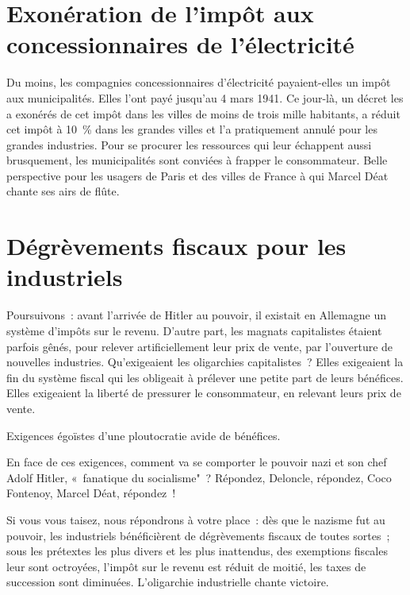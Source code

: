 \documentclass[french,twoside]{book} %
\begin{document}
\section[{Exonération de l’impôt aux concessionnaires de l’électricité}]{Exonération de l’impôt aux concessionnaires de l’électricité}
\noindent Du moins, les compagnies concessionnaires d’électricité payaient-elles un impôt aux municipalités. Elles l’ont payé jusqu’au 4 mars 1941. Ce jour-là, un décret les a exonérés de cet impôt dans les villes de moins de trois mille habitants, a réduit cet impôt à 10 \% dans les grandes villes et l’a pratiquement annulé pour les grandes industries. Pour se procurer les ressources qui leur échappent aussi brusquement, les municipalités sont conviées à frapper le consommateur. Belle perspective pour les usagers de Paris et des villes de France à qui Marcel Déat chante ses airs de flûte.
\section[{Dégrèvements fiscaux pour les industriels}]{Dégrèvements fiscaux pour les industriels}
\noindent Poursuivons : avant l’arrivée de Hitler au pouvoir, il existait en Allemagne un système d’impôts sur le revenu. D’autre part, les magnats capitalistes étaient parfois gênés, pour relever artificiellement leur prix de vente, par l’ouverture de nouvelles industries. Qu’exigeaient les oligarchies capitalistes ? Elles exigeaient la fin du système fiscal qui les obligeait à prélever une petite part de leurs bénéfices. Elles exigeaient la liberté de pressurer le consommateur, en relevant leurs prix de vente.\par
Exigences égoïstes d’une ploutocratie avide de bénéfices.\par
En face de ces exigences, comment va se comporter le pouvoir nazi et son chef Adolf Hitler, « fanatique du socialisme" ? Répondez, Deloncle, répondez, Coco Fontenoy, Marcel Déat, répondez !\par
Si vous vous taisez, nous répondrons à votre place : dès que le nazisme fut au pouvoir, les industriels bénéficièrent de dégrèvements fiscaux de toutes sortes ; sous les prétextes les plus divers et les plus inattendus, des exemptions fiscales leur sont octroyées, l’impôt sur le revenu est réduit de moitié, les taxes de succession sont diminuées. L’oligarchie industrielle chante victoire.
\end{document}
